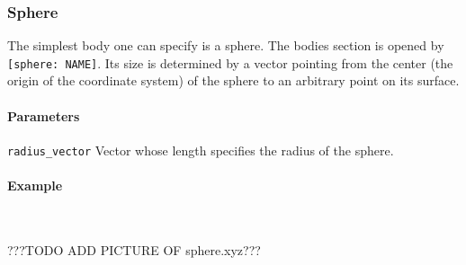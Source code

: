 \subsubsection{Sphere}
The simplest body one can specify is a sphere. The bodies section is opened by \lstinline{[sphere: NAME]}. Its size is determined by a  vector pointing from the center (the origin of the coordinate system) of the sphere to an arbitrary point on its surface.


\paragraph{Parameters}
\begin{description}
 \item{\lstinline{radius_vector}} Vector whose length specifies the radius of the sphere.
\end{description}

\paragraph{Example}\ 


???TODO ADD PICTURE OF sphere.xyz???
